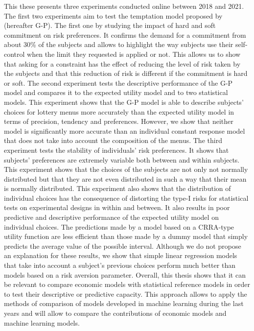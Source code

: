 \documentclass[
]{book}
\begin{document}
This these presents three experiments conducted online between 2018 and 2021.
The first two experiments aim to test the temptation model proposed by
\citet{gul2001temptation} (hereafter G-P).
The first one by studying the impact of hard and soft commitment on risk
preferences.
It confirms the demand for a commitment from about 30\% of the subjects and
allows to highlight the way subjects use their self-control when the limit they
requested is applied or not.
This allows us to show that asking for a constraint has the effect of reducing
the level of risk taken by the subjects and that this reduction of risk is
different if the commitment is hard or soft.
The second experiment tests the descriptive performance of the G-P model and
compares it to the expected utility model and to two statistical models.
This experiment shows that the G-P model is able to describe subjects' choices
for lottery menus more accurately than the expected utility model in terms of
precision, tendency and preferences.
However, we show that neither model is significantly more accurate than an
individual constant response model that does not take into account the
composition of the menus.
The third experiment tests the stability of individuals' risk preferences.
It shows that subjects' preferences are extremely variable both between and
within subjects.
This experiment shows that the choices of the subjects are not only not normally
distributed but that they are not even distributed in such a way that their mean
is normally distributed.
This experiment also shows that the distribution of individual choices has the
consequence of distorting the type-I risks for statistical tests on experimental
designs in within and between.
It also results in poor predictive and descriptive performance of the expected
utility model on individual choices.
The predictions made by a model based on a CRRA-type utility function are less
efficient than those made by a dummy model that simply predicts the average
value of the possible interval.
Although we do not propose an explanation for these results, we show that simple
linear regression models that take into account a subject's previous choices
perform much better than models based on a risk aversion parameter.
Overall, this thesis shows that it can be relevant to compare economic models
with statistical reference models in order to test their descriptive or
predictive capacity.
This approach allows to apply the methods of comparison of models developed in
machine learning during the last years and will allow to compare the
contributions of economic models and machine learning models.
\end{document}

